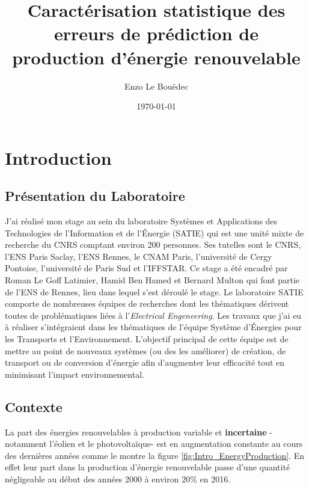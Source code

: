 \documentclass[12pt]{report}
\title{Caractérisation statistique des erreurs de prédiction de production d'énergie renouvelable}
\author{Enzo Le Bouëdec}
\date{\today}
\begin{document}
\maketitle
\tableofcontents

\printnomenclature

\chapter{Introduction}
\section{Présentation du Laboratoire}
J'ai réalisé mon stage au sein du laboratoire Systèmes et Applications des Technologies de l'Information et de l'Énergie (SATIE) qui est une unité mixte de recherche du CNRS comptant environ 200 personnes. Ses tutelles sont le CNRS, l'ENS Paris Saclay, l'ENS Rennes, le CNAM Paris, l'université de Cergy Pontoise, l'université de Paris Sud et l'IFFSTAR. Ce stage a été encadré par Roman Le Goff Latimier, Hamid Ben Hamed et Bernard Multon qui font partie de l'ENS de Rennes, lieu dans lequel s'est déroulé le stage. Le laboratoire SATIE comporte de nombreuses équipes de recherches dont les thématiques dérivent toutes de problématiques liées à l'\textit{Electrical Engeneering}. Les travaux que j'ai eu à réaliser s'intégraient dans les thématiques de l'équipe Système d'Énergies pour les Transports et l'Environnement. L'objectif principal de cette équipe est de mettre au point de nouveaux systèmes (ou des les améliorer) de création, de transport ou de conversion d'énergie afin d'augmenter leur efficacité tout en minimisant l'impact environnemental.

\section{Contexte}

La part des énergies renouvelables à production variable et \textbf{incertaine} -notamment l'éolien et le photovoltaïque- est en augmentation constante au cours des dernières années comme le montre la figure \ref{fig:Intro_EnergyProduction}. En effet leur part dans la production d'énergie renouvelable passe d'une quantité négligeable au début des années 2000 à environ $20 \%$ en 2016.
\end{document}
